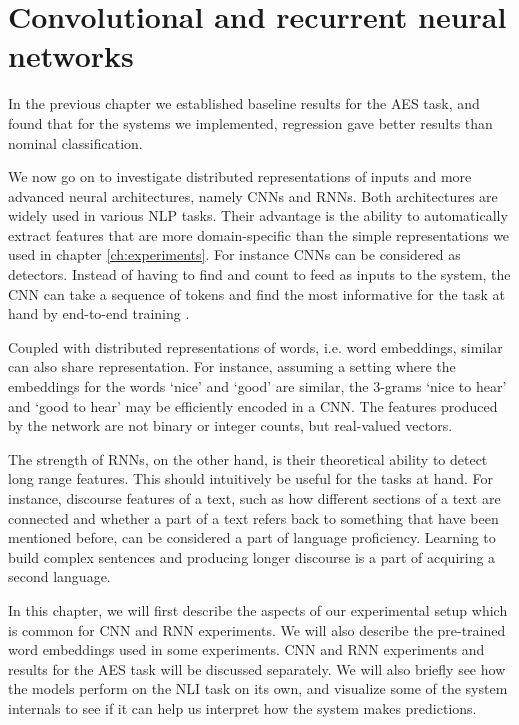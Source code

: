 \chapter{Convolutional and recurrent neural networks} \label{ch:sequencemodels}

In the previous chapter we established baseline results for the \ac{AES} task,
and found that for the systems we implemented, regression gave better results
than nominal classification.

We now go on to investigate distributed representations of inputs and more
advanced neural architectures, namely \acp{CNN} and \acp{RNN}. Both
architectures are widely used in various \ac{NLP} tasks. Their advantage is
the ability to automatically extract features that are more domain-specific
than the simple representations we used in chapter \ref{ch:experiments}. For
instance \acp{CNN} can be considered as \ngram detectors. Instead of having
to find and count \ngrams to feed as inputs to the system, the \ac{CNN} can
take a sequence of tokens and find the most informative \ngrams for the task
at hand by end-to-end training \autocite[155]{goldbergNLP}.

Coupled with distributed representations of words, i.e. word embeddings,
similar \ngrams can also share representation. For instance, assuming a
setting where the embeddings for the words `nice' and `good' are similar, the
3-grams `nice to hear' and `good to hear' may be efficiently encoded in a
\ac{CNN}. The features produced by the network are not binary or integer
counts, but real-valued vectors.

The strength of \acp{RNN}, on the other hand, is their theoretical ability to
detect long range features. This should intuitively be useful for the tasks
at hand. For instance, discourse features of a text, such as how different
sections of a text are connected and whether a part of a text refers back to
something that have been mentioned before, can be considered a part of
language proficiency. Learning to build complex sentences and producing
longer discourse is a part of acquiring a second language.

In this chapter, we will first describe the aspects of our experimental setup
which is common for CNN and RNN experiments. We will also describe the
pre-trained word embeddings used in some experiments. CNN and RNN experiments
and results for the \ac{AES} task will be discussed separately. We will also
briefly see how the models perform on the \ac{NLI} task on its own, and
visualize some of the system internals to see if it can help us interpret
how the system makes predictions.


